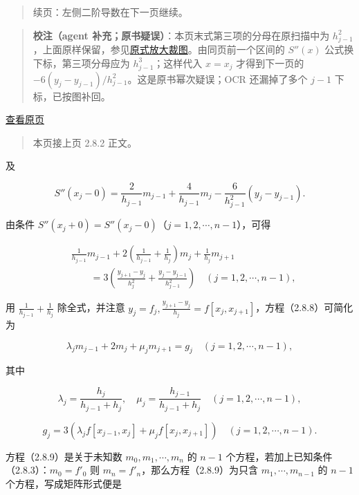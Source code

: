 \documentclass[
  10pt,
  fontset=fandol]{ctexart}
\begin{document}
\begin{quote}
续页：左侧二阶导数在下一页继续。
\end{quote}

\begin{quote}
\textbf{校注（agent 补充；原书疑误）}：本页末式第三项的分母在原扫描中为 \(h_{j-1}^2\)，上面原样保留，参见\href{../assets/ch02b/pdf-050-second-derivative-detail.png}{原式放大裁图}。由同页前一个区间的 \(S''(x)\) 公式换下标，第三项分母应为 \(h_{j-1}^3\)；这样代入 \(x=x_j\) 才得到下一页的 \(-6(y_j-y_{j-1})/h_{j-1}^2\)。这是原书幂次疑误；OCR 还漏掉了多个 \(j-1\) 下标，已按图补回。
\end{quote}

\href{../../source-images/pdf-051.jpeg}{查看原页}

\begin{quote}
本页接上页 2.8.2 正文。
\end{quote}

及

\[S''(x_j-0)=\frac2{h_{j-1}}m_{j-1}+\frac4{h_{j-1}}m_j-\frac6{h_{j-1}^2}(y_j-y_{j-1}).\]

由条件 \(S''(x_j+0)=S''(x_j-0)\)（\(j=1,2,\cdots,n-1\)），可得

\[\begin{aligned}
&\frac1{h_{j-1}}m_{j-1}+2\left(\frac1{h_{j-1}}+\frac1{h_j}\right)m_j+\frac1{h_j}m_{j+1}\\
&\qquad=3\left(\frac{y_{j+1}-y_j}{h_j^2}+\frac{y_j-y_{j-1}}{h_{j-1}^2}\right)\quad(j=1,2,\cdots,n-1),
\end{aligned}\tag{2.8.8}\]

用 \(\frac1{h_{j-1}}+\frac1{h_j}\) 除全式，并注意 \(y_j=f_j,\frac{y_{j+1}-y_j}{h_j}=f[x_j,x_{j+1}]\)，方程（2.8.8）可简化为

\[\lambda_jm_{j-1}+2m_j+\mu_jm_{j+1}=g_j\quad(j=1,2,\cdots,n-1),\tag{2.8.9}\]

其中

\[\lambda_j=\frac{h_j}{h_{j-1}+h_j},\quad\mu_j=\frac{h_{j-1}}{h_{j-1}+h_j}\quad(j=1,2,\cdots,n-1),\tag{2.8.10}\]

\[g_j=3(\lambda_jf[x_{j-1},x_j]+\mu_jf[x_j,x_{j+1}])\quad(j=1,2,\cdots,n-1).\tag{2.8.11}\]

方程（2.8.9）是关于未知数 \(m_0,m_1,\cdots,m_n\) 的 \(n-1\) 个方程，若加上已知条件（2.8.3）：\(m_0=f'_0\) 则 \(m_n=f'_n\)，那么方程（2.8.9）为只含 \(m_1,\cdots,m_{n-1}\) 的 \(n-1\) 个方程，写成矩阵形式便是
\end{document}
